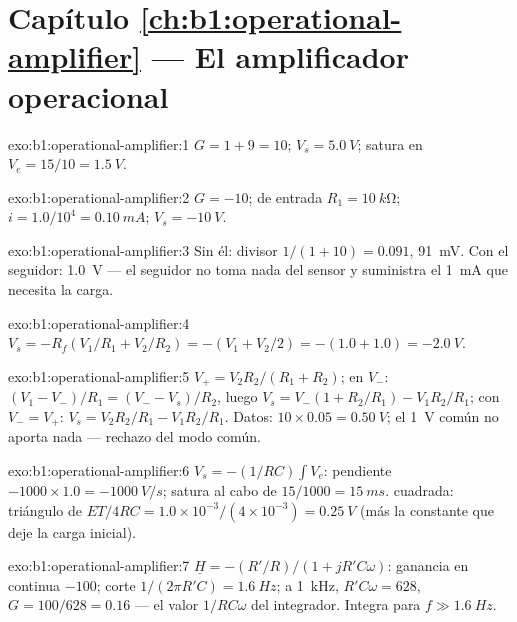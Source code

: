 \section*{Capítulo \ref{ch:b1:operational-amplifier} --- El amplificador operacional}

\begin{solution}{exo:b1:operational-amplifier:1}
$G = 1 + 9 = 10$; $V_s = \qty{5.0}{V}$; satura en $V_e = 15/10 =
\qty{1.5}{V}$.
\end{solution}

\begin{solution}{exo:b1:operational-amplifier:2}
$G = -10$;  de entrada $R_1 = \qty{10}{k\ohm}$; $i = 1.0/10^4 =
\qty{0.10}{mA}$; $V_s = \qty{-10}{V}$.
\end{solution}

\begin{solution}{exo:b1:operational-amplifier:3}
Sin él: divisor $1/(1 + 10) = 0.091$, \qty{91}{mV}. Con el seguidor:
\qty{1.0}{V} --- el seguidor no toma nada del sensor y suministra el
\qty{1}{mA} que necesita la carga.
\end{solution}

\begin{solution}{exo:b1:operational-amplifier:4}
$V_s = -R_f(V_1/R_1 + V_2/R_2) = -(V_1 + V_2/2) = -(1.0 + 1.0) = \qty{-2.0}{V}$.
\end{solution}

\begin{solution}{exo:b1:operational-amplifier:5}
$V_+ = V_2R_2/(R_1 + R_2)$; en $V_-$: $(V_1 - V_-)/R_1 = (V_- - V_s)/R_2$,
luego $V_s = V_-(1 + R_2/R_1) - V_1R_2/R_1$; con $V_- = V_+$:
$V_s = V_2R_2/R_1 - V_1R_2/R_1$. Datos: $10 \times 0.05 = \qty{0.50}{V}$;
el \qty{1}{V} común no aporta nada --- rechazo del modo común.
\end{solution}

\begin{solution}{exo:b1:operational-amplifier:6}
$V_s = -(1/RC)\int V_e$: pendiente $-1000 \times 1.0 = \qty{-1000}{V/s}$;
satura al cabo de $15/1000 = \qty{15}{ms}$.  cuadrada: triángulo de
 $ET/4RC = 1.0 \times 10^{-3}/(4 \times 10^{-3}) = \qty{0.25}{V}$
(más la constante que deje la carga inicial).
\end{solution}

\begin{solution}{exo:b1:operational-amplifier:7}
$\underline H = -(R'/R)/(1 + jR'C\omega)$: ganancia en continua $-100$;
corte $1/(2\pi R'C) = \qty{1.6}{Hz}$; a \qty{1}{kHz}, $R'C\omega = 628$, $G =
100/628 = 0.16$ --- el valor $1/RC\omega$ del integrador. Integra para
$f \gg \qty{1.6}{Hz}$.
\end{solution}

